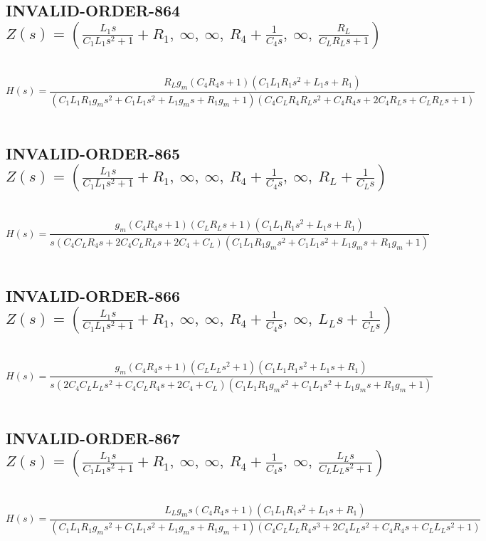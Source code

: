 \documentclass{article}
\begin{document}
\subsection{INVALID-ORDER-864 $Z(s) = \left( \frac{L_{1} s}{C_{1} L_{1} s^{2} + 1} + R_{1}, \  \infty, \  \infty, \  R_{4} + \frac{1}{C_{4} s}, \  \infty, \  \frac{R_{L}}{C_{L} R_{L} s + 1}\right)$ } \ 
\textbf{\[H(s) = \frac{R_{L} g_{m} \left(C_{4} R_{4} s + 1\right) \left(C_{1} L_{1} R_{1} s^{2} + L_{1} s + R_{1}\right)}{\left(C_{1} L_{1} R_{1} g_{m} s^{2} + C_{1} L_{1} s^{2} + L_{1} g_{m} s + R_{1} g_{m} + 1\right) \left(C_{4} C_{L} R_{4} R_{L} s^{2} + C_{4} R_{4} s + 2 C_{4} R_{L} s + C_{L} R_{L} s + 1\right)}\] } \ 
\subsection{INVALID-ORDER-865 $Z(s) = \left( \frac{L_{1} s}{C_{1} L_{1} s^{2} + 1} + R_{1}, \  \infty, \  \infty, \  R_{4} + \frac{1}{C_{4} s}, \  \infty, \  R_{L} + \frac{1}{C_{L} s}\right)$ } \ 
\textbf{\[H(s) = \frac{g_{m} \left(C_{4} R_{4} s + 1\right) \left(C_{L} R_{L} s + 1\right) \left(C_{1} L_{1} R_{1} s^{2} + L_{1} s + R_{1}\right)}{s \left(C_{4} C_{L} R_{4} s + 2 C_{4} C_{L} R_{L} s + 2 C_{4} + C_{L}\right) \left(C_{1} L_{1} R_{1} g_{m} s^{2} + C_{1} L_{1} s^{2} + L_{1} g_{m} s + R_{1} g_{m} + 1\right)}\] } \ 
\subsection{INVALID-ORDER-866 $Z(s) = \left( \frac{L_{1} s}{C_{1} L_{1} s^{2} + 1} + R_{1}, \  \infty, \  \infty, \  R_{4} + \frac{1}{C_{4} s}, \  \infty, \  L_{L} s + \frac{1}{C_{L} s}\right)$ } \ 
\textbf{\[H(s) = \frac{g_{m} \left(C_{4} R_{4} s + 1\right) \left(C_{L} L_{L} s^{2} + 1\right) \left(C_{1} L_{1} R_{1} s^{2} + L_{1} s + R_{1}\right)}{s \left(2 C_{4} C_{L} L_{L} s^{2} + C_{4} C_{L} R_{4} s + 2 C_{4} + C_{L}\right) \left(C_{1} L_{1} R_{1} g_{m} s^{2} + C_{1} L_{1} s^{2} + L_{1} g_{m} s + R_{1} g_{m} + 1\right)}\] } \ 
\subsection{INVALID-ORDER-867 $Z(s) = \left( \frac{L_{1} s}{C_{1} L_{1} s^{2} + 1} + R_{1}, \  \infty, \  \infty, \  R_{4} + \frac{1}{C_{4} s}, \  \infty, \  \frac{L_{L} s}{C_{L} L_{L} s^{2} + 1}\right)$ } \ 
\textbf{\[H(s) = \frac{L_{L} g_{m} s \left(C_{4} R_{4} s + 1\right) \left(C_{1} L_{1} R_{1} s^{2} + L_{1} s + R_{1}\right)}{\left(C_{1} L_{1} R_{1} g_{m} s^{2} + C_{1} L_{1} s^{2} + L_{1} g_{m} s + R_{1} g_{m} + 1\right) \left(C_{4} C_{L} L_{L} R_{4} s^{3} + 2 C_{4} L_{L} s^{2} + C_{4} R_{4} s + C_{L} L_{L} s^{2} + 1\right)}\] } \ 
\end{document}

